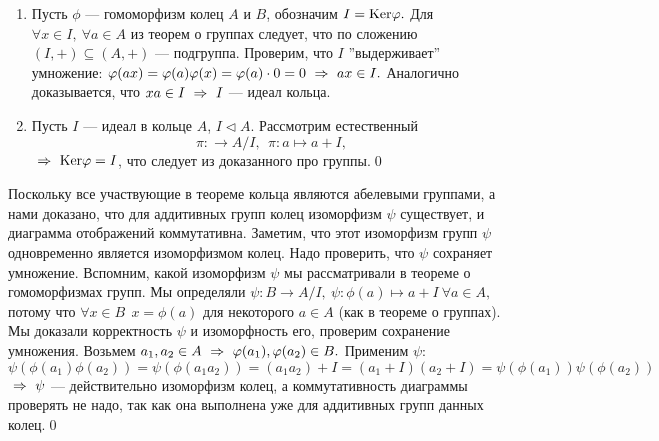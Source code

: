 \dok
\begin{enumerate}
    \item Пусть $\phi$ --- гомоморфизм колец $A$ и $B$, обозначим $I={\rm Ker}\varphi.$ Для $\forall x\in I,\ \forall a\in A$ из теорем о группах следует, что
    по сложению $(I,+)\subseteq(A,+)$ --- подгруппа. Проверим, что $I$ ''выдерживает'' умножение: $\varphi(ax)=\varphi(a)\varphi(x)=\varphi(a)\cdot 0=0\ \Rightarrow\  ax\in I.$
    Аналогично доказывается, что $xa\in I\ \Rightarrow\  I$ --- идеал кольца.
    \item Пусть $I$ --- идеал в кольце $A$, $I\lhd A.$ Рассмотрим естественный \gmm $$\pi : \rightarrow A/I,\ \ \pi : a\mapsto a+I,$$ $\ \Rightarrow\ {\rm Ker}\varphi=I$, что следует из
    доказанного про группы.\qquad\qed
\end{enumerate}


\dok Поскольку все участвующие в теореме кольца являются абелевыми группами, а нами доказано, что для аддитивных групп колец изоморфизм $\psi$ существует,
и диаграмма отображений коммутативна. Заметим, что этот изоморфизм групп $\psi$ одновременно является изоморфизмом колец. Надо проверить, что $\psi$ сохраняет умножение.
Вспомним, какой изоморфизм $\psi$ мы рассматривали в теореме о гомоморфизмах групп. Мы определяли $\psi : B\rightarrow A/I,\ \psi : \phi(a)\mapsto a+I\ \forall a\in A,$ потому что
$\forall x\in B\ \ x=\phi(a)$ для некоторого $a\in A$ (как в теореме о группах). Мы доказали корректность $\psi$ и изоморфность его, проверим сохранение умножения.
Возьмем $a_1, a_2\in A\ \Rightarrow\  \varphi(a_1), \varphi(a_2)\in B.$ Применим $\psi$:
$$
\psi(\phi(a_1)\phi(a_2))=\psi(\phi(a_1a_2))=(a_1a_2)+I=(a_1+I)(a_2+I)=\psi(\phi(a_1))\psi(\phi(a_2))
$$
$\ \Rightarrow\  \psi$ --- действительно изоморфизм колец, а коммутативность диаграммы проверять не надо, так как она выполнена уже для аддитивных групп данных колец.\qquad\qed

